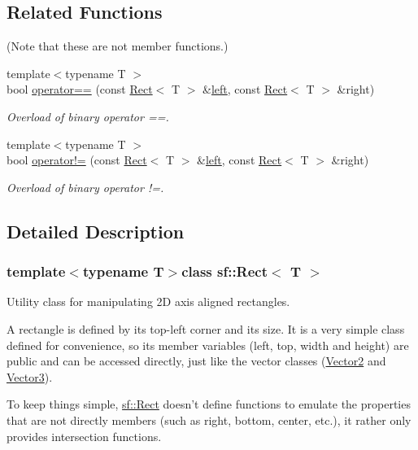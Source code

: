 \subsection*{Related Functions}
(Note that these are not member functions.) \begin{DoxyCompactItemize}
\item 
{\footnotesize template$<$typename T $>$ }\\bool \hyperlink{classsf_1_1_rect_ab3488b5dbd0e587c4d7cb80605affc46}{operator==} (const \hyperlink{classsf_1_1_rect}{Rect}$<$ T $>$ \&\hyperlink{classsf_1_1_rect_aa49960fa465103d9cb7069ceb25c7c32}{left}, const \hyperlink{classsf_1_1_rect}{Rect}$<$ T $>$ \&right)
\begin{DoxyCompactList}\small\item\em Overload of binary operator ==. \end{DoxyCompactList}\item 
{\footnotesize template$<$typename T $>$ }\\bool \hyperlink{classsf_1_1_rect_a03fc4c105687b7d0f07b6b4ed4b45581}{operator!=} (const \hyperlink{classsf_1_1_rect}{Rect}$<$ T $>$ \&\hyperlink{classsf_1_1_rect_aa49960fa465103d9cb7069ceb25c7c32}{left}, const \hyperlink{classsf_1_1_rect}{Rect}$<$ T $>$ \&right)
\begin{DoxyCompactList}\small\item\em Overload of binary operator !=. \end{DoxyCompactList}\end{DoxyCompactItemize}


\subsection{Detailed Description}
\subsubsection*{template$<$typename T$>$class sf\+::\+Rect$<$ T $>$}

Utility class for manipulating 2\+D axis aligned rectangles. 

A rectangle is defined by its top-\/left corner and its size. It is a very simple class defined for convenience, so its member variables (left, top, width and height) are public and can be accessed directly, just like the vector classes (\hyperlink{classsf_1_1_vector2}{Vector2} and \hyperlink{classsf_1_1_vector3}{Vector3}).

To keep things simple, \hyperlink{classsf_1_1_rect}{sf\+::\+Rect} doesn't define functions to emulate the properties that are not directly members (such as right, bottom, center, etc.), it rather only provides intersection functions.

